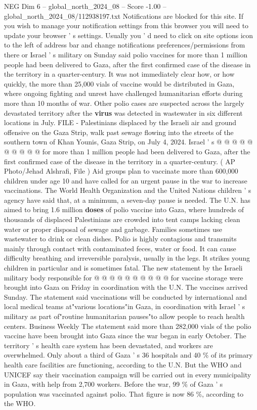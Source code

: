 \begin{textsample}{NEG Dim 6 – global\_north\_2024\_08 – Score -1.00 – global\_north\_2024\_08/112938197.txt}  \label{ex:f6_neg_068}
Notifications are blocked for this site.
If you wish to manage your notification settings from this browser you will need to update your browser ' s settings.
Usually you ' d need to click on site options icon to the left of address bar and change notifications preferences/permissions from there or Israel ' s military on Sunday said polio vaccines for more than 1 million people had been delivered to Gaza, after the first confirmed case of the disease in the territory in a quarter-century.
It was not immediately clear how, or how quickly, the more than 25,000 vials of vaccine would be distributed in Gaza, where ongoing fighting and unrest have challenged humanitarian efforts during more than 10 months of war.
Other polio cases are suspected across the largely devastated territory after the \textbf{virus} was detected in wastewater in six different locations in July.
FILE - Palestinians displaced by the Israeli air and ground offensive on the Gaza Strip, walk past sewage flowing into the streets of the southern town of Khan Younis, Gaza Strip, on July 4, 2024.
Israel ' s @ @ @ @ @ @ @ @ @ @ for more than 1 million people had been delivered to Gaza, after the first confirmed case of the disease in the territory in a quarter-century. ( AP Photo/Jehad Alshrafi, File ) Aid groups plan to vaccinate more than 600,000 children under age 10 and have called for an urgent pause in the war to increase vaccinations.
The World Health Organization and the United Nations children ' s agency have said that, at a minimum, a seven-day pause is needed.
The U.N. has aimed to bring 1.6 million \textbf{doses} of polio vaccine into Gaza, where hundreds of thousands of displaced Palestinians are crowded into tent camps lacking clean water or proper disposal of sewage and garbage.
Families sometimes use wastewater to drink or clean dishes.
Polio is highly contagious and transmits mainly through contact with contaminated feces, water or food.
It can cause difficulty breathing and irreversible paralysis, usually in the legs.
It strikes young children in particular and is sometimes fatal.
The new statement by the Israeli military body responsible for @ @ @ @ @ @ @ @ @ @ for vaccine storage were brought into Gaza on Friday in coordination with the U.N.
The vaccines arrived Sunday.
The statement said vaccinations will be conducted by international and local medical teams at"various locations"in Gaza, in coordination with Israel ' s military as part of"routine humanitarian pauses"to allow people to reach health centers.
Business Weekly The statement said more than 282,000 vials of the polio vaccine have been brought into Gaza since the war began in early October.
The territory ' s health care system has been devastated, and workers are overwhelmed.
Only about a third of Gaza ' s 36 hospitals and 40 \% of its primary health care facilities are functioning, according to the U.N.
But the WHO and UNICEF say their vaccination campaign will be carried out in every municipality in Gaza, with help from 2,700 workers.
Before the war, 99 \% of Gaza ' s population was vaccinated against polio.
That figure is now 86 \%, according to the WHO.

\end{textsample}
